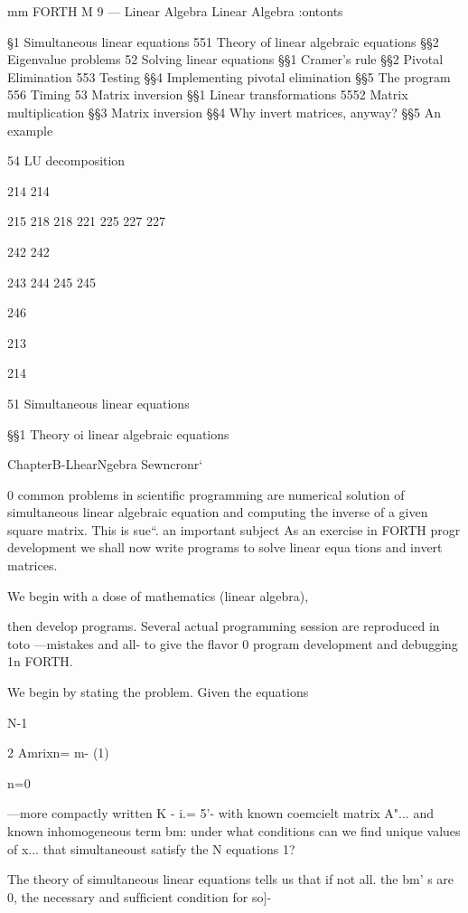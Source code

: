 mm FORTH M 9 — Linear Algebra
Linear Algebra
:ontonts

\S1 Simultaneous linear equations
551 Theory of linear algebraic equations
\S\S2 Eigenvalue problems
52 Solving linear equations
\S\S1 Cramer's rule
\S\S2 Pivotal Elimination
553 Testing
\S\S4 Implementing pivotal elimination
\S\S5 The program
556 Timing
53 Matrix inversion
\S\S1 Linear transformations
5552 Matrix multiplication
\S\S3 Matrix inversion
\S\S4 Why invert matrices, anyway?
\S\S5 An example

54 LU decomposition

214
214

215
218
218
221
225
227
227

242
242

243
244
245
245

246

213

214

51 Simultaneous linear equations

\S\S1 Theory oi linear algebraic equations

ChapterB-LhearNgebra Sewncronr‘

      
 
   
 

0 common problems in scientiﬁc programming are
numerical solution of simultaneous linear algebraic equation
and computing the inverse of a given square matrix. This is sue“.
an important subject As an exercise in FORTH progr
development we shall now write programs to solve linear equa
tions and invert matrices.

We begin with a dose of mathematics (linear algebra),

then develop programs. Several actual programming session
are reproduced in toto —mistakes and all- to give the ﬂavor 0
program development and debugging 1n FORTH.

We begin by stating the problem. Given the equations

N-1

2 Amrixn= m- (1)

n=0

—more compactly written K - i.= 5'- with known coemcielt
matrix A"... and known inhomogeneous term bm: under what
conditions can we ﬁnd unique values of x... that simultaneoust
satisfy the N equations 1?

The theory of simultaneous linear equations tells us that if not all.
the bm’ s are 0, the necessary and sufﬁcient condition for so]-

